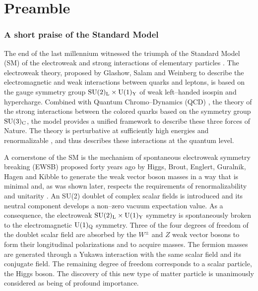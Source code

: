 
\section{Preamble}

\subsubsection*{A short praise of the Standard Model}

The end of the last millennium witnessed the triumph of the Standard Model (SM)
of the electroweak and strong interactions of elementary particles
\cite{GSW,QCD}.  The electroweak theory, proposed by Glashow, Salam and
Weinberg \cite{GSW} to describe the electromagnetic \cite{QED} and weak
\cite{WEAK} interactions between quarks and leptons, is based on the gauge
symmetry group ${\rm SU(2)_L \times U(1)_Y}$ of weak left--handed isospin and
hypercharge. Combined with Quantum Chromo--Dynamics (QCD) \cite{QCD}, the
theory of the strong interactions between the colored quarks based on the 
symmetry group ${\rm SU(3)_C}$, the model provides a unified framework to
describe these three forces of Nature. The theory is perturbative at
sufficiently high energies \cite{QCD} and renormalizable \cite{RENORM}, and
thus describes these interactions at the quantum level.\s

A cornerstone of the SM is the mechanism of spontaneous electroweak symmetry
breaking (EWSB) proposed forty years ago by Higgs, Brout, Englert, Guralnik,
Hagen and Kibble \cite{Higgs} to generate the weak vector boson masses in a way
that is minimal and, as was shown later, respects the requirements of
renormalizability \cite{RENORM} and unitarity \cite{UNITARITY}.  An SU(2)
doublet of complex scalar fields is introduced and its neutral component
develops a non--zero vacuum expectation value. As a consequence, the
electroweak ${\rm SU(2)_L \times U(1)_Y}$ symmetry is spontaneously broken to
the electromagnetic ${\rm U(1)_Q}$ symmetry.  Three of the four degrees of
freedom of the doublet scalar field are absorbed by the $W^\pm$ and $Z$ weak
vector bosons to form their longitudinal polarizations and to acquire masses. 
The fermion masses are generated through a Yukawa interaction with the same
scalar field and its conjugate field.  The remaining degree of freedom
corresponds to a scalar particle, the Higgs boson. The discovery of this new
type of matter particle is unanimously considered as being of profound
importance.\s

